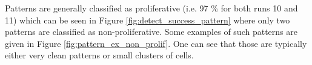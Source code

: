 Patterns are generally classified as proliferative (i.e. 97 \% for both runs 10 and 11) which can be seen in Figure \ref{fig:detect_success_pattern} where only two patterns are classified as non-proliferative. Some examples of such patterns are given in Figure \ref{fig:pattern_ex_non_prolif}. One can see that those are typically either very clean patterns or small clusters of cells.

\begin{figure}
	\center
	

\end{figure}
